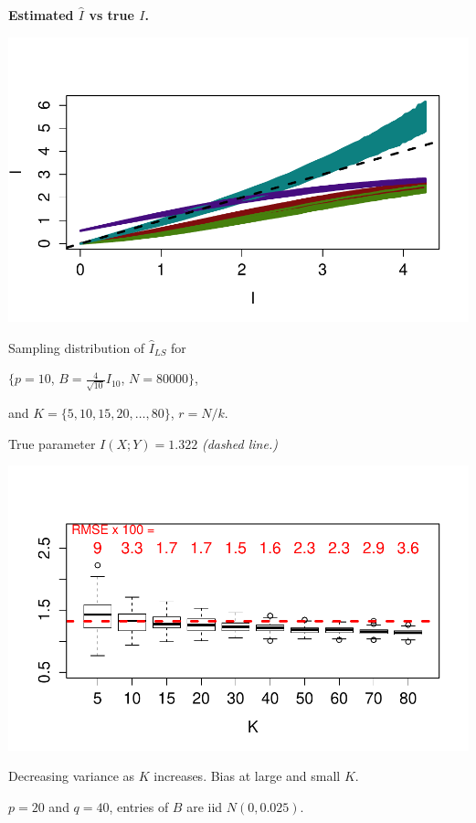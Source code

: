 \documentclass[12pt]{article}
\begin{document}
\begin{center}
\textbf{Estimated $\hat{I}$ vs true $I$.} 

\includegraphics[scale = 0.5, clip=true, trim=0.4in 0.5in 0 0.5in]{../info_theory_sims/fig4.pdf}
\end{center}

Sampling distribution of $\hat{I}_{LS}$ for \small{$\{p = 10$, $B = \frac{4}{\sqrt{10}} I_{10}$, $N = 80000\}$,

and $K = \{5, 10, 15, 20, \hdots, 80\}$, $r = N/k$.}

True parameter $I(X; Y) = 1.322$ \emph{(dashed line.)}
\begin{center}
\includegraphics[scale = 0.6, clip = true, trim = 0 0.5in 0 0.5in]{../info_theory_sims/fig5a.pdf}
\end{center}

Decreasing variance as $K$ increases. Bias at large and small $K$.

$p = 20$ and $q = 40$, entries of $B$ are iid $N(0, 0.025)$.
\end{document}
